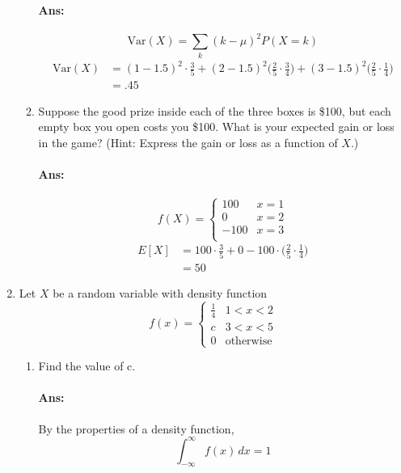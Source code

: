 \documentclass[letterpaper,12pt]{article}
\begin{document}
\begin{enumerate}
\begin{enumerate}[label=(\alph*).]
            \paragraph{Ans:}
            \begin{equation}
                \mathrm{Var}(X) = \sum_k (k-\mu)^2 P(X=k)
            \end{equation}
            \begin{align*}
                \mathrm{Var}(X) &= (1-1.5)^2\cdot\frac{3}{5}+(2-1.5)^2\bigg(\frac{2}{5}\cdot \frac{3}{4}\bigg) + (3-1.5)^2\bigg(\frac{2}{5}\cdot \frac{1}{4}\bigg)\\
                                &= .45
            \end{align*}
        \item Suppose the good prize inside each of the three boxes is \$100, but each empty box
you open costs you \$100. What is your expected gain or loss in the game? (Hint:
Express the gain or loss as a function of $X$.)
\paragraph{Ans:}
\[ f(X) = \begin{cases}
    100 & x = 1 \\
    0 & x = 2 \\
    -100 & x = 3 \\
    \end{cases}
\]
\begin{align*}
    E[X] &= 100\cdot\frac{3}{5} + 0 -100\cdot\bigg(\frac{2}{5}\cdot\frac{1}{4}\bigg)\\
         &= 50
\end{align*}
    \end{enumerate}
\item Let $X$ be a random variable with density function
    \[ f(x) = \begin{cases}
        \frac{1}{4} & 1 <x<2 \\
        c & 3 < x < 5\\
        0 & \mathrm{otherwise}
        \end{cases}
    \]
    \begin{enumerate}[label=(\alph*).]
        \item Find the value of c.
            \paragraph{Ans:} By the properties of a density function,
            \[
                \int_{-\infty}^{\infty} f(x)\,dx = 1
            \]

\end{enumerate}
\end{enumerate}
\end{document}
